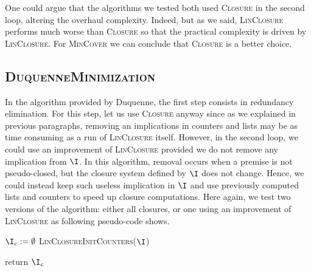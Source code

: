 \vspace{1.2em}

One could argue that the algorithms we tested both used \textsc{Closure} in the second loop, altering the overhaul complexity. Indeed, but as we said, \textsc{LinClosure} performs much worse than \textsc{Closure} so that the practical complexity is driven by \textsc{LinClosure}. For \textsc{MinCover}
we can conclude that \textsc{Closure} is a better choice.

\subsection{\textsc{DuquenneMinimization}}

In the algorithm provided by Duquenne, the first step consists in redundancy elimination. For this step, let us use \textsc{Closure} anyway since as we
explained in previous paragraphs, removing an implications in counters and
lists may be as time consuming as a run of \textsc{LinClosure} itself. However,
in the second loop, we could use an improvement of \textsc{LinClosure} provided
we do not remove any implication from $\I$. In this algorithm, removal occurs
when a premise is not pseudo-closed, but the closure system defined by $\I$
does not change. Hence, we could instead keep such useless implication in 
$\I$ and use previously computed lists and counters to speed up closure computations. Here again, we test two versions of the algorithm: either all
closures, or one using an improvement of \textsc{LinClosure} as following pseudo-code shows.

\vspace{1.2em}

\begin{algorithm}[H]
	
	\BlankLine
	\BlankLine
	
	$\I_c := \emptyset$ \;
	\textsc{LinClosureInitCounters}($\I$) \;
	
	
	return $\I_c$ \;

	\label{alg:DuquenneLin}
	
\end{algorithm}

